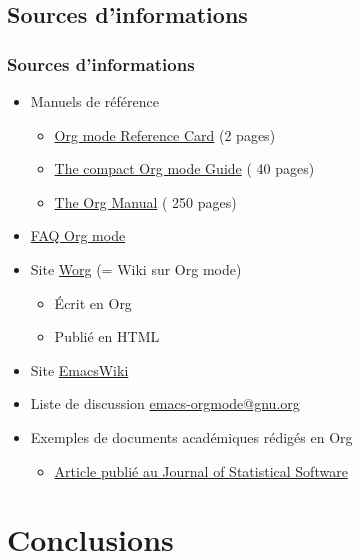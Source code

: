 \documentclass[presentation,t,hideothersubsections]{beamer}
\begin{document}
\subsection{Sources d'informations}
\label{sec-6-2}
\begin{frame}
\frametitle{Sources d'informations}
\label{sec-6-2-1}


\begin{itemize}
\item Manuels de référence
\begin{itemize}
\item \href{http://orgmode.org/orgcard.pdf}{Org mode Reference Card} (2 pages)
\item \href{http://orgmode.org/orgguide.pdf}{The compact Org mode Guide} (\textpm{} 40 pages)
\item \href{http://orgmode.org/org.pdf}{The Org Manual} (\textpm{} 250 pages)
\end{itemize}
\item \href{http://orgmode.org/worg/org-faq.html}{FAQ Org mode}
\item Site \href{http://orgmode.org/worg/}{Worg} (= Wiki sur Org mode)
\begin{itemize}
\item Écrit en Org
\item Publié en HTML
\end{itemize}
\item Site \href{http://www.emacswiki.org/emacs/OrgMode}{EmacsWiki}
\item Liste de discussion \href{mailto:emacs-orgmode@gnu.org}{emacs-orgmode@gnu.org}
\item Exemples de documents académiques rédigés en Org
\begin{itemize}
\item \href{http://www.jstatsoft.org/v46/i03}{Article publié au Journal of Statistical Software}
\end{itemize}
\end{itemize}
\end{frame}
\section{Conclusions}
\label{sec-7}
\end{document}
